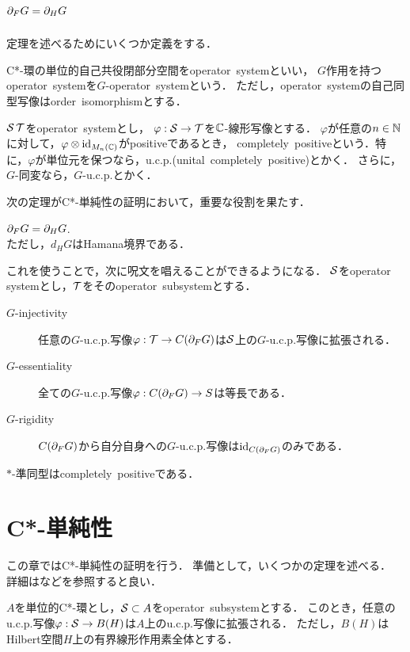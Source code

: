\documentclass{jsarticle}[12pt]
\begin{document}
\section{$\d_F G = \d_H G$}
定理を述べるためにいくつか定義をする．
\begin{definition}
  C*-環の単位的自己共役閉部分空間をoperator\, systemといい，
  $G$作用を持つoperator\, systemを$G$-operator\, systemという．
  ただし，operator\, systemの自己同型写像はorder\, isomorphismとする．

  $\S\, \T$をoperator\, systemとし，
  $\varphi:\S \rightarrow \T$を$\C$-線形写像とする．
  $\varphi$が任意の$n \in \N$に対して，$\varphi\otimes {\id_{M_n(\C)}}$がpositiveであるとき，
  completely\, positiveという．特に，$\varphi$が単位元を保つなら，u.c.p.(unital\, completely\, positive)とかく．
  さらに，$G$-同変なら，$G$-u.c.p.とかく．
\end{definition}
次の定理がC*-単純性の証明において，重要な役割を果たす．
\begin{theorem}
  $\d_F G = \d_H G$.\\
  ただし，$d_H G$はHamana境界である．
\end{theorem}
これを使うことで，次に呪文を唱えることができるようになる．
$\S$をoperator\, systemとし，$\T$をそのoperator\, subsystemとする．
\begin{description}
\item[$G$-injectivity] 任意の$G$-u.c.p.写像$\varphi: \T \rightarrow C(\d_F G)$は$\S$上の$G$-u.c.p.写像に拡張される．
\item[$G$-essentiality] 全ての$G$-u.c.p.写像$\varphi: C(\d_F G) \rightarrow S$は等長である．
\item[$G$-rigidity] $C(\d_F G)$から自分自身への$G$-u.c.p.写像は${\rm id}_{C(\d_F G)}$のみである．
\end{description}
\begin{remark}
  $\ast$-準同型はcompletely\, positiveである．
\end{remark}
\section{C*-単純性}
この章ではC*-単純性の証明を行う．
準備として，いくつかの定理を述べる．
詳細は\cite{brown2008c}などを参照すると良い．
\begin{theorem}
  $A$を単位的C*-環とし，$\S \subset A$をoperator\, subsystemとする．
  このとき，任意のu.c.p.写像$\varphi:\S \rightarrow B(H)$は$A$上のu.c.p.写像に拡張される．
  ただし，$B(H)$はHilbert空間$H$上の有界線形作用素全体とする．
\end{theorem}
\end{document}
